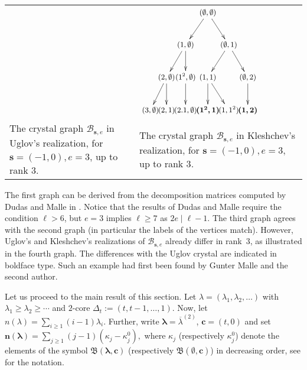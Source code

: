 \documentclass[twoside,12pt]{amsart}
\theoremstyle{plain}
\begin{document}
\begin{center}
\begin{tabular}{M{5.5cm}|M{5.5cm}}
&

$
{\small
\begin{xy}
\xymatrix@C-31pt{
& & & (\emptyset,\emptyset) \ar[dl] \ar[dr] & & \\ 
& & (1,\emptyset) \ar[dl] \ar[d] & &  (\emptyset,1) \ar[dl] \ar[dr]  & \\
& (2,\emptyset) \ar[dl] \ar[d] & (1^2,\emptyset)  \ar[d] & (1,1) \ar[d] \ar[dr] & & (\emptyset,2) \ar[d] \\
(3,\emptyset) & (2,1) & (2.1,\emptyset) & \boldsymbol{(1^2,1)} & (1,1^2) & \boldsymbol{(1,2)}
}
\end{xy}
}$

\tabularnewline

The crystal graph ${\mathcal{B}}_{{\mathbf{s}},e}$ in Uglov's realization, for ${\mathbf{s}}=(-1,0), 
e=3$, up to rank $3$.

&
The crystal graph ${\mathcal{B}}_{{\mathbf{s}},e}$ in Kleshchev's realization, for ${\mathbf{s}}=(-1,0), 
e=3$, up to rank $3$.

\end{tabular}
\end{center}
The first graph can be derived from the decomposition matrices computed by
Dudas and Malle in \cite{DudasMalle2013}. Notice that the results of Dudas and 
Malle require the condition $\ell > 6$, but $e = 3$ implies $\ell \geq 7$ 
as $2e \mid \ell - 1$. 
The third graph agrees with the second graph (in particular the labels of the 
vertices match). However, Uglov's and Kleshchev's realizations of ${\mathcal{B}}_{{\mathbf{s}},e}$ 
already differ in rank~$3$, as illustrated in the fourth graph.
The differences with the Uglov crystal are indicated in boldface type.
Such an example had first been found by Gunter Malle and the second author.

Let us proceed to the main result of this section.
Let ${\lambda}=({\lambda}_1, {\lambda}_2, \dots)$ with $\lambda_1 \geq \lambda_2 \geq \cdots$
and $2$-core ${\Delta}_t := (t,t-1,\dots, 1)$.
Now, let $n({\lambda}) = \sum_{i\geq 1} (i-1){\lambda}_i.$ Further, write 
${\boldsymbol{\lambda}}=\overline{\lambda}^{(2)}$, ${\mathbf{c}}=(t,0)$ and set 
${\mathbf{n}}({\boldsymbol{\lambda}}) = \sum_{j\geq1} (j-1) ({\kappa}_j - {\kappa}_j^0),$
where ${\kappa}_j$ (respectively ${\kappa}_j^0$) denote the elements of the symbol 
${\mathfrak{B}}({\boldsymbol{\lambda}},{\mathbf{c}})$ (respectively ${\mathfrak{B}}({\boldsymbol{\emptyset}},{\mathbf{c}})$) in decreasing order, 
see \cite[Section 2.2]{JaconLecouvey2012} for the notation.
\end{document}
